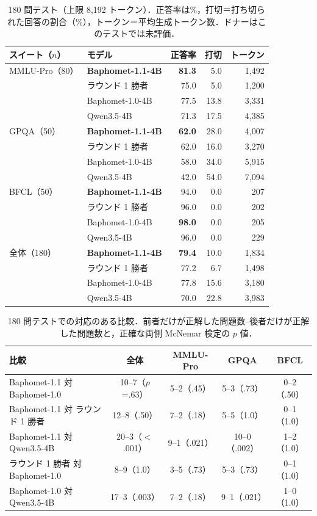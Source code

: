 \documentclass[uplatex,dvipdfmx,10pt,a4paper]{jsarticle}
\begin{document}
\begin{table}[htbp]
\centering\small
\caption{180 問テスト（上限 8,192 トークン）．正答率は\%，打切＝打ち切られた回答の割合（\%），トークン＝平均生成トークン数．ドナーはこのテストでは未評価．}
\label{tab:test}
\setlength{\tabcolsep}{4pt}
\begin{tabular}{llrrr}
\toprule
スイート（$n$） & モデル & 正答率 & 打切 & トークン \\
\midrule
MMLU-Pro（80） & \textbf{Baphomet-1.1-4B} & \textbf{81.3} & 5.0 & 1,492 \\
 & ラウンド 1 勝者 & 75.0 & 5.0 & 1,200 \\
 & Baphomet-1.0-4B & 77.5 & 13.8 & 3,331 \\
 & Qwen3.5-4B & 71.3 & 17.5 & 4,385 \\
\midrule
GPQA（50） & \textbf{Baphomet-1.1-4B} & \textbf{62.0} & 28.0 & 4,007 \\
 & ラウンド 1 勝者 & 62.0 & 16.0 & 3,270 \\
 & Baphomet-1.0-4B & 58.0 & 34.0 & 5,915 \\
 & Qwen3.5-4B & 42.0 & 54.0 & 7,094 \\
\midrule
BFCL（50） & \textbf{Baphomet-1.1-4B} & 94.0 & 0.0 & 207 \\
 & ラウンド 1 勝者 & 96.0 & 0.0 & 202 \\
 & Baphomet-1.0-4B & \textbf{98.0} & 0.0 & 205 \\
 & Qwen3.5-4B & 96.0 & 0.0 & 229 \\
\midrule
全体（180） & \textbf{Baphomet-1.1-4B} & \textbf{79.4} & 10.0 & 1,834 \\
 & ラウンド 1 勝者 & 77.2 & 6.7 & 1,498 \\
 & Baphomet-1.0-4B & 77.8 & 15.6 & 3,180 \\
 & Qwen3.5-4B & 70.0 & 22.8 & 3,983 \\
\bottomrule
\end{tabular}
\end{table}

\begin{table}[htbp]
\centering\small
\caption{180 問テストでの対応のある比較．前者だけが正解した問題数--後者だけが正解した問題数と，正確な両側 McNemar 検定の $p$ 値．}
\label{tab:mcnemar}
\setlength{\tabcolsep}{4pt}
\begin{tabular}{lcccc}
\toprule
比較 & 全体 & MMLU-Pro & GPQA & BFCL \\
\midrule
Baphomet-1.1 対 Baphomet-1.0 & 10--7（$p$=.63） & 5--2（.45） & 5--3（.73） & 0--2（.50） \\
Baphomet-1.1 対 ラウンド 1 勝者 & 12--8（.50） & 7--2（.18） & 5--5（1.0） & 0--1（1.0） \\
Baphomet-1.1 対 Qwen3.5-4B & 20--3（$<$.001） & 9--1（.021） & 10--0（.002） & 1--2（1.0） \\
ラウンド 1 勝者 対 Baphomet-1.0 & 8--9（1.0） & 3--5（.73） & 5--3（.73） & 0--1（1.0） \\
Baphomet-1.0 対 Qwen3.5-4B & 17--3（.003） & 7--2（.18） & 9--1（.021） & 1--0（1.0） \\
\bottomrule
\end{tabular}
\end{table}
\end{document}
